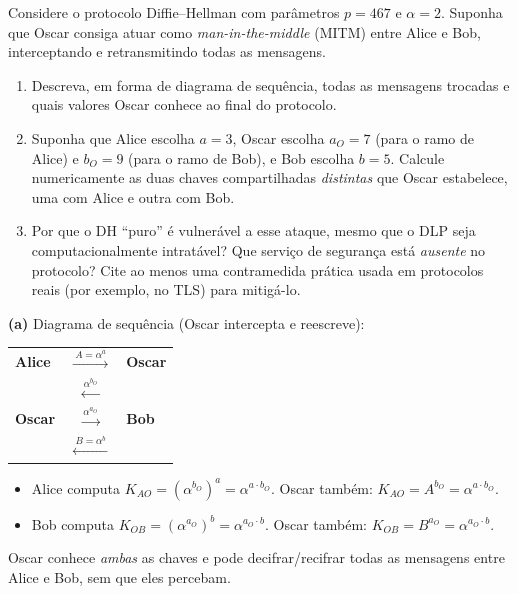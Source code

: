 \documentclass[12pt,a4paper]{article}
\begin{document}
\begin{exercicio}[breakable]
Considere o protocolo Diffie--Hellman com par\^{a}metros $p = 467$ e $\alpha = 2$. Suponha que Oscar consiga atuar como \emph{man-in-the-middle} (MITM) entre Alice e Bob, interceptando e retransmitindo todas as mensagens.
\begin{enumerate}[label=(\alph*)]
    \item Descreva, em forma de diagrama de sequ\^{e}ncia, todas as mensagens trocadas e quais valores Oscar conhece ao final do protocolo.
    \item Suponha que Alice escolha $a = 3$, Oscar escolha $a_O = 7$ (para o ramo de Alice) e $b_O = 9$ (para o ramo de Bob), e Bob escolha $b = 5$. Calcule numericamente as duas chaves compartilhadas \emph{distintas} que Oscar estabelece, uma com Alice e outra com Bob.
    \item Por que o DH ``puro'' \'{e} vulner\'{a}vel a esse ataque, mesmo que o DLP seja computacionalmente intrat\'{a}vel? Que servi\c{c}o de seguran\c{c}a est\'{a} \emph{ausente} no protocolo? Cite ao menos uma contramedida pr\'{a}tica usada em protocolos reais (por exemplo, no TLS) para mitig\'{a}-lo.
\end{enumerate}

\begin{resposta}
\textbf{(a)} Diagrama de sequ\^{e}ncia (Oscar intercepta e reescreve):
\begin{center}
\begin{tabular}{lcl}
\textbf{Alice} & $\xrightarrow{\ A = \alpha^{a}\ }$ & \textbf{Oscar} \\
               & $\xleftarrow{\ \alpha^{b_O}\ }$ & \\
\textbf{Oscar} & $\xrightarrow{\ \alpha^{a_O}\ }$ & \textbf{Bob} \\
               & $\xleftarrow{\ B = \alpha^{b}\ }$ &
\end{tabular}
\end{center}
\begin{itemize}[leftmargin=1.4em,topsep=2pt,itemsep=1pt]
    \item Alice computa $K_{AO} = (\alpha^{b_O})^{a} = \alpha^{a \cdot b_O}.$ Oscar tamb\'{e}m: $K_{AO} = A^{b_O} = \alpha^{a \cdot b_O}.$
    \item Bob computa $K_{OB} = (\alpha^{a_O})^{b} = \alpha^{a_O \cdot b}.$ Oscar tamb\'{e}m: $K_{OB} = B^{a_O} = \alpha^{a_O \cdot b}.$
\end{itemize}
Oscar conhece \emph{ambas} as chaves e pode decifrar/recifrar todas as mensagens entre Alice e Bob, sem que eles percebam.


\end{resposta}
\end{exercicio}
\end{document}
